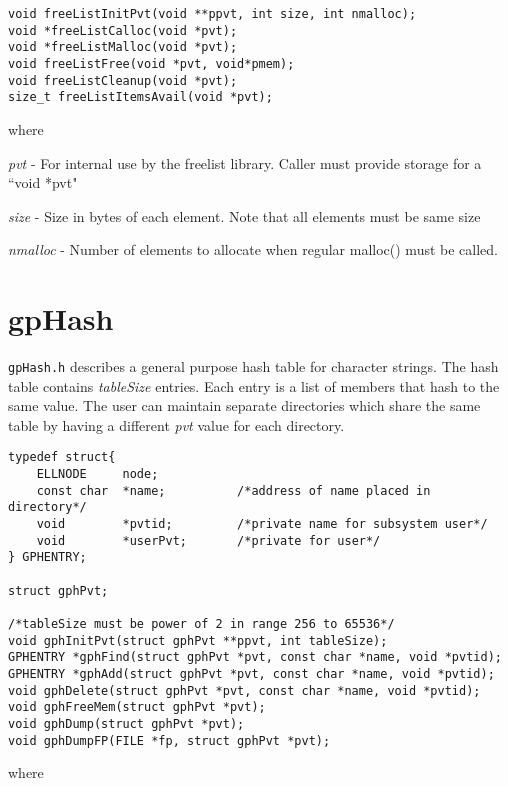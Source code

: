 \begin{verbatim}void freeListInitPvt(void **ppvt, int size, int nmalloc);
void *freeListCalloc(void *pvt);
void *freeListMalloc(void *pvt);
void freeListFree(void *pvt, void*pmem);
void freeListCleanup(void *pvt);
size_t freeListItemsAvail(void *pvt);
\end{verbatim}
where

\begin{description}\item \emph{pvt}  - For internal use by the freelist library. Caller must provide storage for a ``void *pvt"

\item \emph{size} - Size in bytes of each element. Note that all elements must be same size

\item \emph{nmalloc} - Number of elements to allocate when regular malloc() must be called.

\end{description}\section{gpHash}

\verb|gpHash.h| describes a general purpose hash table for character strings. The hash table contains \emph{tableSize} entries. Each 
entry is a list of members that hash to the same value. The user can maintain separate directories which share the same 
table by having a different \emph{pvt} value for each directory.

\begin{verbatim}typedef struct{
    ELLNODE     node;
    const char  *name;          /*address of name placed in directory*/
    void        *pvtid;         /*private name for subsystem user*/
    void        *userPvt;       /*private for user*/
} GPHENTRY;

struct gphPvt;

/*tableSize must be power of 2 in range 256 to 65536*/
void gphInitPvt(struct gphPvt **ppvt, int tableSize);
GPHENTRY *gphFind(struct gphPvt *pvt, const char *name, void *pvtid);
GPHENTRY *gphAdd(struct gphPvt *pvt, const char *name, void *pvtid);
void gphDelete(struct gphPvt *pvt, const char *name, void *pvtid);
void gphFreeMem(struct gphPvt *pvt);
void gphDump(struct gphPvt *pvt);
void gphDumpFP(FILE *fp, struct gphPvt *pvt);
\end{verbatim}
where

